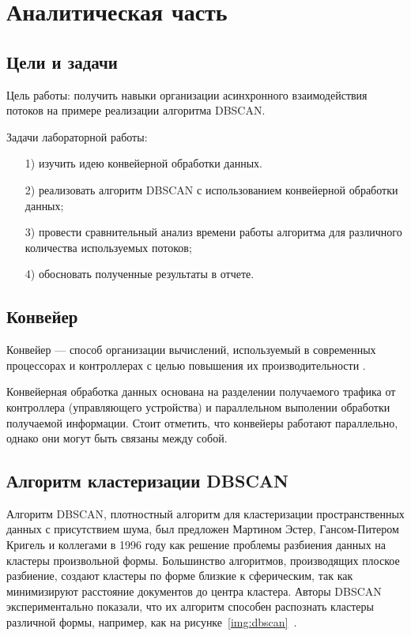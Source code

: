 \chapter{Аналитическая часть}

\section{Цели и задачи}

Цель работы: получить навыки организации асинхронного взаимодействия потоков на примере реализации алгоритма DBSCAN.

Задачи лабораторной работы:
\begin{enumerate}
	\item[1)] изучить идею конвейерной обработки данных.
	\item[2)] реализовать алгоритм DBSCAN с использованием конвейерной обработки данных;
	\item[3)] провести сравнительный анализ времени работы алгоритма для различного количества используемых потоков;
	\item[4)] обосновать полученные результаты в отчете.
\end{enumerate}

\section{Конвейер}

Конвейер --- способ организации вычислений, используемый в современных процессорах и контроллерах с целью повышения их производительности \cite{conv}. 

Конвейерная обработка данных основана на разделении получаемого трафика от контроллера (управляющего устройства) и параллельном выполении обработки получаемой информации.
Стоит отметить, что конвейеры работают параллельно, однако они могут быть связаны между собой.

\section{Алгоритм кластеризации DBSCAN}

Алгоритм DBSCAN, плотностный алгоритм для кластеризации пространственных данных с присутствием шума, был предложен Мартином Эстер, Гансом-Питером Кригель и коллегами в 1996 году как решение проблемы разбиения данных на кластеры произвольной формы.
Большинство алгоритмов, производящих плоское разбиение, создают кластеры по форме близкие к сферическим, так как минимизируют расстояние документов до центра кластера.
Авторы DBSCAN экспериментально показали, что их алгоритм способен распознать кластеры различной формы, например, как на \mbox{рисунке \ref{img:dbscan} \cite[197]{book}}.

